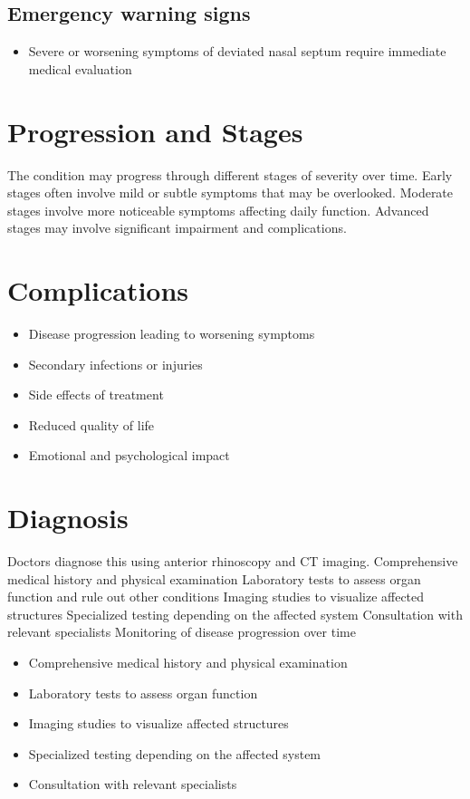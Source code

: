 \subsection{Emergency warning signs}
\begin{itemize}[noitemsep]
  \item Severe or worsening symptoms of deviated nasal septum require immediate medical evaluation
\end{itemize}
\section{Progression and Stages}
The condition may progress through different stages of severity over time. Early stages often involve mild or subtle symptoms that may be overlooked. Moderate stages involve more noticeable symptoms affecting daily function. Advanced stages may involve significant impairment and complications.
\section{Complications}
\begin{itemize}[noitemsep]
  \item Disease progression leading to worsening symptoms
  \item Secondary infections or injuries
  \item Side effects of treatment
  \item Reduced quality of life
  \item Emotional and psychological impact
\end{itemize}
\section{Diagnosis}
Doctors diagnose this using anterior rhinoscopy and CT imaging. Comprehensive medical history and physical examination Laboratory tests to assess organ function and rule out other conditions Imaging studies to visualize affected structures Specialized testing depending on the affected system Consultation with relevant specialists Monitoring of disease progression over time

\begin{itemize}[noitemsep]
  \item Comprehensive medical history and physical examination
  \item Laboratory tests to assess organ function
  \item Imaging studies to visualize affected structures
  \item Specialized testing depending on the affected system
  \item Consultation with relevant specialists
\end{itemize}
